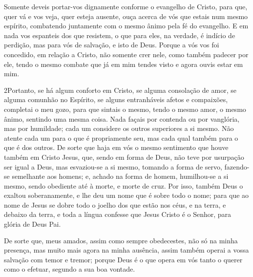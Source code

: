 Somente deveis portar-vos dignamente conforme o evangelho de
Cristo, para que, quer vá e vos veja, quer esteja ausente, ouça
acerca de vós que estais num mesmo espírito, combatendo juntamente
com o mesmo ânimo pela fé do evangelho. E em nada vos
espanteis dos que resistem, o que para eles, na verdade, é indício
de perdição, mas para vós de salvação, e isto de Deus. Porque
a vós vos foi concedido, em relação a Cristo, não somente crer nele,
como também padecer por ele, tendo o mesmo combate que já em
mim tendes visto e agora ouvis estar em mim.

\medskip

\lettrine{2} Portanto, se há algum conforto em Cristo, se
alguma consolação de amor, se alguma comunhão no Espírito, se alguns
entranháveis afetos e compaixões, completai o meu gozo, para que
sintais o mesmo, tendo o mesmo amor, o mesmo ânimo, sentindo uma
mesma coisa. Nada façais por contenda ou por vanglória, mas por
humildade; cada um considere os outros superiores a si mesmo.
Não atente cada um para o que é propriamente seu, mas cada qual
também para o que é dos outros. De sorte que haja em vós o mesmo
sentimento que houve também em Cristo Jesus, que, sendo em forma
de Deus, não teve por usurpação ser igual a Deus, mas
esvaziou-se a si mesmo, tomando a forma de servo, fazendo-se
semelhante aos homens; e, achado na forma de homem, humilhou-se
a si mesmo, sendo obediente até à morte, e morte de cruz. Por
isso, também Deus o exaltou soberanamente, e lhe deu um nome que é
sobre todo o nome; para que ao nome de Jesus se dobre todo o
joelho dos que estão nos céus, e na terra, e debaixo da terra,
e toda a língua confesse que Jesus Cristo é o Senhor, para
glória de Deus Pai.

De sorte que, meus amados, assim como sempre obedecestes, não só
na minha presença, mas muito mais agora na minha ausência, assim
também operai a vossa salvação com temor e tremor; porque
Deus é o que opera em vós tanto o querer como o efetuar, segundo a
sua boa vontade.

